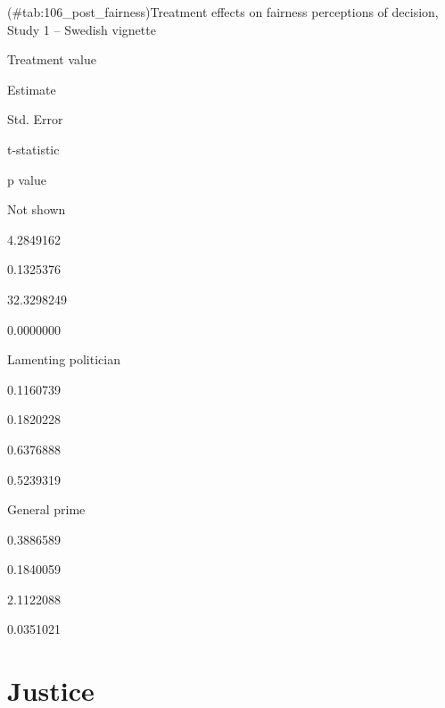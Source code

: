 \documentclass[]{book}
\begin{document}
(\#tab:106\_post\_fairness)Treatment effects on fairness perceptions of
decision, Study 1 -- Swedish vignette

Treatment value

Estimate

Std. Error

t-statistic

p value

Not shown

4.2849162

0.1325376

32.3298249

0.0000000

Lamenting politician

0.1160739

0.1820228

0.6376888

0.5239319

General prime

0.3886589

0.1840059

2.1122088

0.0351021

\section{Justice}\label{justice-2}
\end{document}
